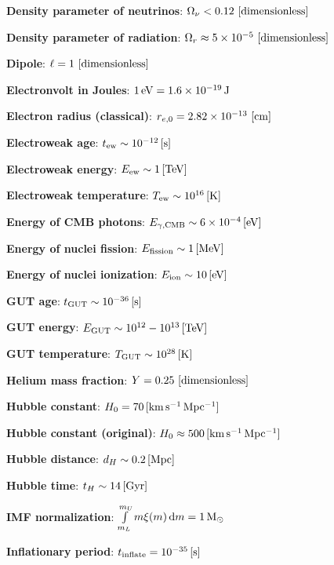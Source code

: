 \documentclass[a4paper,10pt]{article}
\begin{document}
{\noindent}\textbf{Density parameter of neutrinos}: $\Omega_\nu < 0.12 ~ [{\rm dimensionless}]$

{\noindent}\textbf{Density parameter of radiation}: $\Omega_r \approx 5\times10^{-5} ~ [{\rm dimensionless}]$

{\noindent}\textbf{Dipole}: $\ell=1 ~ [{\rm dimensionless}]$

{\noindent}\textbf{Electronvolt in Joules}: $1\,{\rm eV} = 1.6\times10^{-19}\,{\rm J}$

{\noindent}\textbf{Electron radius (classical)}: $r_{e,0}=2.82\times10^{-13} ~ [{\rm cm}]$

{\noindent}\textbf{Electroweak age}: $t_\mathrm{ew} \sim 10^{-12}\,[{\rm s}]$

{\noindent}\textbf{Electroweak energy}: $E_\mathrm{ew} \sim 1\,[{\rm TeV}]$

{\noindent}\textbf{Electroweak temperature}: $T_\mathrm{ew} \sim 10^{16}\,[{\rm K}]$

{\noindent}\textbf{Energy of CMB photons}: $E_{\gamma,\mathrm{CMB}} \sim 6\times10^{-4}\,[{\rm eV}]$

{\noindent}\textbf{Energy of nuclei fission}: $E_\mathrm{fission} \sim 1\,[{\rm MeV}]$

{\noindent}\textbf{Energy of nuclei ionization}: $E_\mathrm{ion} \sim 10\,[{\rm eV}]$

{\noindent}\textbf{GUT age}: $t_\mathrm{GUT} \sim 10^{-36}\,[{\rm s}]$

{\noindent}\textbf{GUT energy}: $E_\mathrm{GUT} \sim 10^{12}-10^{13}\,[{\rm TeV}]$

{\noindent}\textbf{GUT temperature}: $T_\mathrm{GUT} \sim 10^{28}\,[{\rm K}]$

{\noindent}\textbf{Helium mass fraction}: $Y = 0.25 ~ [{\rm dimensionless}]$

{\noindent}\textbf{Hubble constant}: $H_0 = 70\,[{\rm km\,s^{-1}\,Mpc^{-1}}]$

{\noindent}\textbf{Hubble constant (original)}: $H_0 \approx 500\,[{\rm km\,s^{-1}\,Mpc^{-1}}]$

{\noindent}\textbf{Hubble distance}: $d_H \sim 0.2\,[{\rm Mpc}]$

{\noindent}\textbf{Hubble time}: $t_H \sim 14\,[{\rm Gyr}]$

{\noindent}\textbf{IMF normalization}: $\int\limits_{m_L}^{m_U} m\xi(m)\,\mathrm{d}m = 1\,{\rm M}_\odot$

{\noindent}\textbf{Inflationary period}: $t_\mathrm{inflate} = 10^{-35}\,[{\rm s}]$
\end{document}
